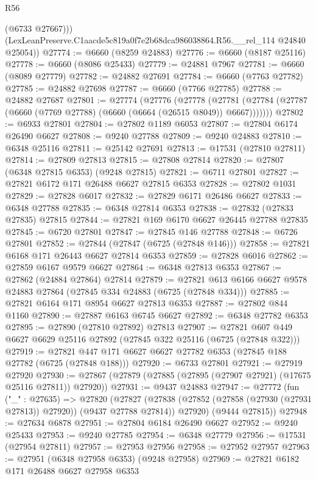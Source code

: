 \begin{lexlean}{R56}
\begin{coremodule}
          (@6733 @27667)))
      (LexLeanPreserve.C1aacde5c819a0f7e2b68dca986038864.R56.__rel_114 @24840 @25054))
@27774 := @6660 (@8259 @24883)
@27776 := @6660 (@8187 @25116)
@27778 := @6660 (@8086 @25433)
@27779 := @24881 @7967
@27781 := @6660 (@8089 @27779)
@27782 := @24882 @27691
@27784 := @6660 (@7763 @27782)
@27785 := @24882 @27698
@27787 := @6660 (@7766 @27785)
@27788 := @24882 @27687
@27801 := @27774
    (@27776
      (@27778
        (@27781 (@27784 (@27787 (@6660 (@7769 @27788) (@6660 (@6664 (@26515 @8049)) @6667)))))))
@27802 := @6933 @27801
@27804 := @27802 @1189 @6053
@27807 := @27804 @6174 @26490 @6627
@27808 := @9240 @27788
@27809 := @9240 @24883
@27810 := @6348 @25116
@27811 := @25142 @27691
@27813 := @17531 (@27810 @27811)
@27814 := @27809 @27813
@27815 := @27808 @27814
@27820 := @27807 (@6348 @27815 @6353) (@9248 @27815)
@27821 := @6711 @27801
@27827 := @27821 @6172 @171 @26488 @6627 @27815 @6353
@27828 := @27802 @1031
@27829 := @27828 @6017
@27832 := @27829 @6171 @26486 @6627
@27833 := @6348 @27788
@27835 := @6348 @27814 @6353
@27838 := @27832 (@27833 @27835) @27815
@27844 := @27821 @169 @6170 @6627 @26445 @27788 @27835
@27845 := @6720 @27801
@27847 := @27845 @146 @27788
@27848 := @6726 @27801
@27852 := @27844 (@27847 (@6725 (@27848 @146)))
@27858 := @27821 @6168 @171 @26443 @6627 @27814 @6353
@27859 := @27828 @6016
@27862 := @27859 @6167 @9579 @6627
@27864 := @6348 @27813 @6353
@27867 := @27862 (@24884 @27864) @27814
@27879 := @27821 @613 @6166 @6627 @9578 @24883 @27864 (@27845 @334 @24883 (@6725 (@27848 @334)))
@27885 := @27821 @6164 @171 @8954 @6627 @27813 @6353
@27887 := @27802 @844 @1160
@27890 := @27887 @6163 @6745 @6627
@27892 := @6348 @27782 @6353
@27895 := @27890 (@27810 @27892) @27813
@27907 := @27821 @607 @449 @6627 @6629 @25116 @27892 (@27845 @322 @25116 (@6725 (@27848 @322)))
@27919 := @27821 @447 @171 @6627 @6627 @27782 @6353 (@27845 @188 @27782 (@6725 (@27848 @188)))
@27920 := @6733 @27801
@27921 := @27919 @27920
@27930 := @27867 (@27879 (@27885 (@27895 (@27907 @27921) (@17675 @25116 @27811)) @27920))
@27931 := @9437 @24883
@27947 := @27772
    (fun ("_" : @27635) =>
    @27820
      (@27827
        (@27838 (@27852 (@27858 (@27930 (@27931 @27813)) @27920)) (@9437 @27788 @27814))
        @27920)
      (@9444 @27815))
@27948 := @27634 @6878
@27951 := @27804 @6184 @26490 @6627
@27952 := @9240 @25433
@27953 := @9240 @27785
@27954 := @6348 @27779
@27956 := @17531 (@27954 @27811)
@27957 := @27953 @27956
@27958 := @27952 @27957
@27963 := @27951 (@6348 @27958 @6353) (@9248 @27958)
@27969 := @27821 @6182 @171 @26488 @6627 @27958 @6353

\end{coremodule}
\end{lexlean}
